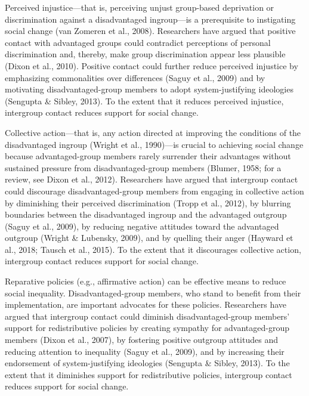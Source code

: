 \documentclass[12pt, letterpaper]{article}
\begin{document}
Perceived injustice---that is, perceiving unjust group-based deprivation
or discrimination against a disadvantaged ingroup---is a prerequisite to
instigating social change (van Zomeren et al., 2008). Researchers have
argued that positive contact with advantaged groups could contradict
perceptions of personal discrimination and, thereby, make group
discrimination appear less plausible (Dixon et al., 2010). Positive
contact could further reduce perceived injustice by emphasizing
commonalities over differences (Saguy et al., 2009) and by motivating
disadvantaged-group members to adopt system-justifying ideologies
(Sengupta \& Sibley, 2013). To the extent that it reduces perceived
injustice, intergroup contact reduces support for social change.

Collective action---that is, any action directed at improving the
conditions of the disadvantaged ingroup (Wright et al., 1990)---is
crucial to achieving social change because advantaged-group members
rarely surrender their advantages without sustained pressure from
disadvantaged-group members (Blumer, 1958; for a review, see Dixon et
al., 2012). Researchers have argued that intergroup contact could
discourage disadvantaged-group members from engaging in collective
action by diminishing their perceived discrimination (Tropp et al.,
2012), by blurring boundaries between the disadvantaged ingroup and the
advantaged outgroup (Saguy et al., 2009), by reducing negative attitudes
toward the advantaged outgroup (Wright \& Lubensky, 2009), and by
quelling their anger (Hayward et al., 2018; Tausch et al., 2015). To the
extent that it discourages collective action, intergroup contact reduces
support for social change.

Reparative policies (e.g., affirmative action) can be effective means to
reduce social inequality. Disadvantaged-group members, who stand to
benefit from their implementation, are important advocates for these
policies. Researchers have argued that intergroup contact could diminish
disadvantaged-group members' support for redistributive policies by
creating sympathy for advantaged-group members (Dixon et al., 2007), by
fostering positive outgroup attitudes and reducing attention to
inequality (Saguy et al., 2009), and by increasing their endorsement of
system-justifying ideologies (Sengupta \& Sibley, 2013). To the extent
that it diminishes support for redistributive policies, intergroup
contact reduces support for social change.
\end{document}
